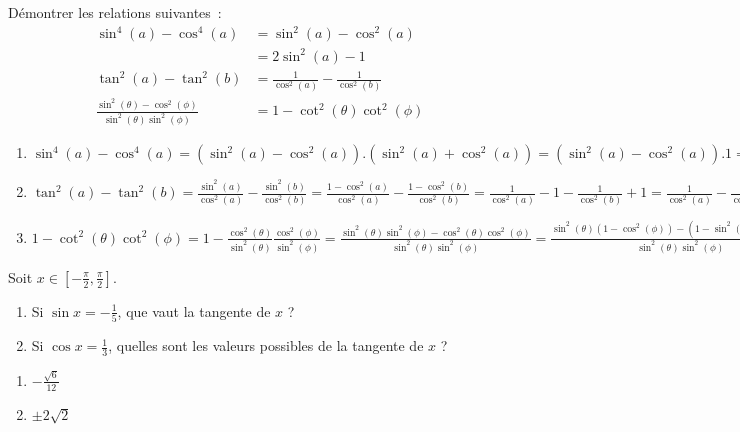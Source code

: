 \documentclass[12pt,french,oneside,a4paper]{memoir} %
\begin{document}
\begin{exo}
 Démontrer les relations suivantes~:
  \begin{equation*}
    \begin{split}
      \sin^4(a) - \cos^4(a) &= \sin^2(a) - \cos^2(a)\\
      & = 2 \sin^2(a) -
      1\\
      \tan^2(a) - \tan^2(b) &= \frac1{\cos^2(a)} -
      \frac1{\cos^2(b)}\\
      \frac{\sin ^2(\theta) - \cos^2(\phi)}{\sin ^2(\theta)
        \sin^2(\phi)} &= 1 - \cot^2(\theta) \cot^2(\phi)
    \end{split}
  \end{equation*}
  \begin{correction}
    \begin{enumerate}
    \item $\sin^4(a) - \cos^4(a) = (\sin^2(a) - \cos^2(a)).(\sin^2(a) + \cos^2(a))= (\sin^2(a) - \cos^2(a)) . 1 = \sin^2(a) - \cos^2(a) = \sin^2(a) - (1-\sin^2(a))= 2\sin^2(a)-1$

    \item $ \tan^2(a) - \tan^2(b) = \frac{\sin^2(a)}{\cos^2(a)} - \frac{\sin^2(b)}{\cos^2(b)} = \frac{1 - \cos^2(a)}{\cos^2(a)} - \frac{1-\cos^2(b)}{\cos^2(b)} = \frac{1}{\cos^2(a)} - 1 - \frac{1}{\cos^2(b)} + 1 = \frac{1}{\cos^2(a)} - \frac{1}{\cos^2(b)} $

    \item $ 1 - \cot^2(\theta) \cot^2(\phi) = 1 - \frac{\cos^2(\theta)}{\sin^2(\theta)} \frac{\cos^2(\phi)}{\sin^2(\phi)} = \frac{\sin^2(\theta)\sin^2(\phi) - \cos^2(\theta)\cos^2(\phi)}{\sin^2(\theta)\sin^2(\phi)} = \frac{\sin^2(\theta)(1 - \cos^2(\phi)) - (1 - \sin^2(\theta))\cos^2(\phi)}{\sin^2(\theta)\sin^2(\phi)} = \frac{\sin^2(\theta) - \sin^2(\theta)\cos^2(\phi) - \cos^2(\phi) + \sin^2(\theta)\cos^2(\phi)}{\sin^2(\theta)\sin^2(\phi)} = \frac{\sin^2(\theta) - \cos^2(\phi) }{\sin^2(\theta)\sin^2(\phi)}$
    \end{enumerate}
\end{correction}
\end{exo}

\begin{exo}Soit $x \in \left[ -\frac\pi2, \frac\pi2 \right]$.
  \begin{enumerate}
  \item Si $\sin x = -\frac{1}{5}$, que vaut la tangente de $x$ ?
  \item Si $\cos x = \frac{1}{3}$, quelles sont les valeurs possibles
    de la tangente de $x$ ?
  \end{enumerate}
  \begin{correction}
    \begin{enumerate}
    \item $-\frac{\sqrt{6}}{12}$
    \item $\pm2\sqrt{2}$
    \end{enumerate}
\end{correction}
\end{exo}
\end{document}
